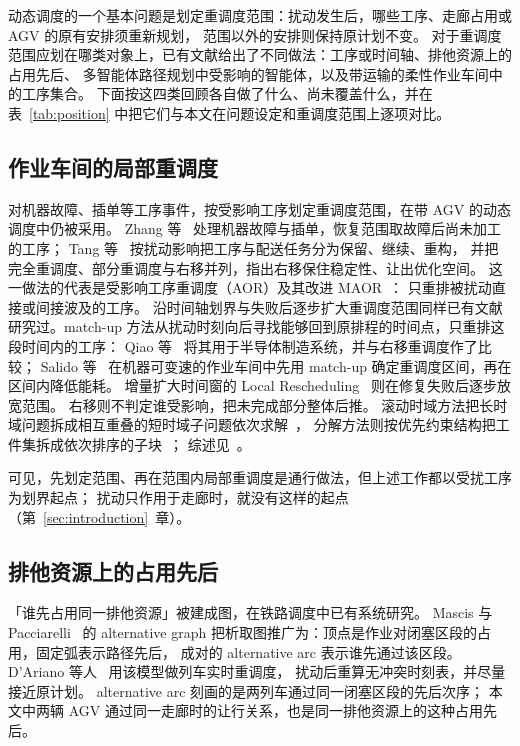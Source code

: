 \documentclass[manuscript,screen,review]{acmart}
\begin{document}

动态调度的一个基本问题是划定重调度范围：扰动发生后，哪些工序、走廊占用或 AGV 的原有安排须重新规划，
范围以外的安排则保持原计划不变。
对于重调度范围应划在哪类对象上，已有文献给出了不同做法：工序或时间轴、排他资源上的占用先后、
多智能体路径规划中受影响的智能体，以及带运输的柔性作业车间中的工序集合。
下面按这四类回顾各自做了什么、尚未覆盖什么，并在表~\ref{tab:position} 中把它们与本文在问题设定和重调度范围上逐项对比。

\subsection{作业车间的局部重调度}
\label{sec:rw_aor}

对机器故障、插单等工序事件，按受影响工序划定重调度范围，在带 AGV 的动态调度中仍被采用。
Zhang 等~\cite{zhang2023energy} 处理机器故障与插单，恢复范围取故障后尚未加工的工序；
Tang 等~\cite{tang2026dynamic} 按扰动影响把工序与配送任务分为保留、继续、重构，
并把完全重调度、部分重调度与右移并列，指出右移保住稳定性、让出优化空间。
这一做法的代表是受影响工序重调度（AOR）及其改进 MAOR~\cite{subramaniam2003maor}：
只重排被扰动直接或间接波及的工序。
沿时间轴划界与失败后逐步扩大重调度范围同样已有文献研究过。match-up 方法从扰动时刻向后寻找能够回到原排程的时间点，只重排这段时间内的工序：
Qiao 等~\cite{qiao2012single} 将其用于半导体制造系统，并与右移重调度作了比较；
Salido 等~\cite{salido2017rescheduling} 在机器可变速的作业车间中先用 match-up 确定重调度区间，再在区间内降低能耗。
增量扩大时间窗的 Local Rescheduling~\cite{kuster2007local} 则在修复失败后逐步放宽范围。
右移则不判定谁受影响，把未完成部分整体后推。
滚动时域方法把长时域问题拆成相互重叠的短时域子问题依次求解~\cite{li2025learning}，
分解方法则按优先约束结构把工件集拆成依次排序的子块~\cite{margot2003decompositions}；
综述见~\cite{vieira2003rescheduling,ouelhadj2009survey}。

可见，先划定范围、再在范围内局部重调度是通行做法，但上述工作都以受扰工序为划界起点；
扰动只作用于走廊时，就没有这样的起点（第~\ref{sec:introduction}~章）。

\subsection{排他资源上的占用先后}
\label{sec:rw_ag}

「谁先占用同一排他资源」被建成图，在铁路调度中已有系统研究。
Mascis 与 Pacciarelli~\cite{mascis2002alternative} 的 alternative graph
把析取图推广为：顶点是作业对闭塞区段的占用，固定弧表示路径先后，
成对的 alternative arc 表示谁先通过该区段。
D'Ariano 等人~\cite{dariano2007branch} 用该模型做列车实时重调度，
扰动后重算无冲突时刻表，并尽量接近原计划。
alternative arc 刻画的是两列车通过同一闭塞区段的先后次序；
本文中两辆 AGV 通过同一走廊时的让行关系，也是同一排他资源上的这种占用先后。
\end{document}
